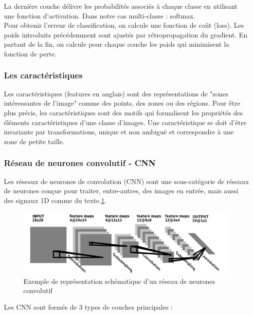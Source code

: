 \documentclass[12pt,english, openany]{book}
\begin{document}
La dernière couche délivre les probabilités associés à chaque classe en utilisant une fonction d'activation. Dans notre cas multi-classe : softmax.\\

Pour obtenir l'erreur de classification, on calcule une fonction de coût (loss). Les poids introduits précédemment sont ajustés par rétropropagation du gradient. En partant de la fin, on calcule pour chaque couche les poids qui minimisent la fonction de perte.\\



\subsubsection{Les caractéristiques}
Les caractéristiques (features en anglais) sont des représentations de "zones intéressantes de l'image" comme des points, des zones ou des régions. Pour être plus précis, les caractéristiques sont des motifs qui formalisent les propriétés des éléments caractéristiques d'une classe d'images. Une caractéristique se doit d'être invariante par transformations, unique et non ambiguë et correspondre à une zone de petite taille.

\subsubsection{Réseau de neurones convolutif - CNN}
\label{subsec:CNN}
Les réseaux de neurones de convolution (CNN) sont une sous-catégorie de réseaux de neurones conçue pour traiter, entre-autres, des images en entrée, mais aussi des signaux 1D comme du texte.\ref{fig:CNN}.\\

\begin{figure}[h]
  \centering
  \includegraphics[width=\textwidth]{images/CNN.png}
  \caption{Exemple de représentation schématique d'un réseau de neurones convolutif \cite{articleCNN}}
  \label{fig:CNN}
\end{figure}


Les CNN sont formés de 3 types de couches principales :\\
\end{document}
